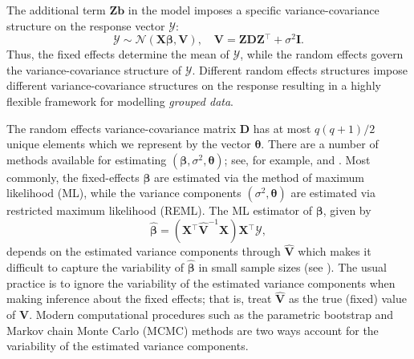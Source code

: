 \documentclass{article}\usepackage[]{graphicx}\usepackage[]{color}
\newcommand{\trans}{\ensuremath{^\top}}
\begin{document}
The additional term $\bm{Z}\bm{b}$ in the model imposes a specific variance-covariance structure on the response vector $\bm{\mathcal{Y}}$:
\[
  \bm{\mathcal{Y}} \sim \mathcal{N}\left(\bm{X}\bm{\beta}, \bm{V}\right), \quad \bm{V} = \bm{Z}\bm{D}\bm{Z}\trans + \sigma^2\bm{I}.
\]
Thus, the fixed effects determine the mean of $\bm{\mathcal{Y}}$, while the random effects govern the variance-covariance structure of $\bm{\mathcal{Y}}$.  Different random effects structures impose different variance-covariance structures on the response resulting in a highly flexible framework for modelling \emph{grouped data}.

The random effects variance-covariance matrix $\bm{D}$ has at most $q(q+1)/2$ unique elements which we represent by the vector $\bm{\theta}$.  There are a number of methods available for estimating $\left( \bm{\beta}, \sigma^2, \bm{\theta} \right)$; see, for example, \citet[chap 6.]{mcculloch_generalized_2008} and \citet[chap. 2]{demidenko_mixed_2013}.  Most commonly, the fixed-effects $\bm{\beta}$ are estimated via the method of maximum likelihood (ML), while the variance components $\left(\sigma^2, \bm{\theta}\right)$ are estimated via restricted maximum likelihood (REML).  The ML estimator of $\bm{\beta}$, given by
\begin{equation*}
\widehat{\bm{\beta}} = \left( \bm{X}\trans \widehat{\bm{V}}^{-1} \bm{X} \right)\bm{X}\trans\bm{\mathcal{Y}},
\end{equation*}
depends on the estimated variance components through $\widehat{\bm{V}}$ which makes it difficult to capture the variability of $\widehat{\bm{\beta}}$ in small sample sizes (see \citet[pp. 165-167]{mcculloch_generalized_2008}).  The usual practice is to ignore the variability of the estimated variance components when making inference about the fixed effects; that is, treat $\widehat{\bm{V}}$ as the true (fixed) value of $\bm{V}$.  Modern computational procedures such as the parametric bootstrap and Markov chain Monte Carlo (MCMC) methods are two ways account for the variability of the estimated variance components.


\end{document}
